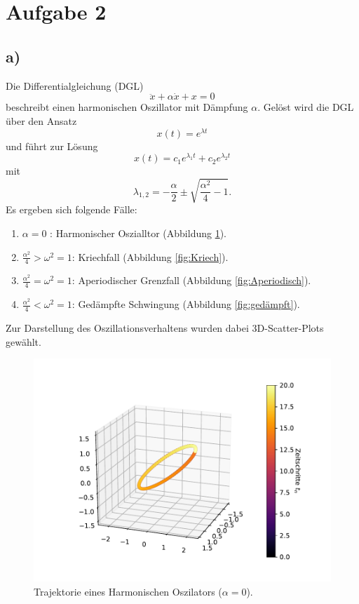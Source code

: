 \section*{Aufgabe 2}
\subsection*{a)}
Die Differentialgleichung (DGL) 
\begin{equation}
    \ddot{x} + \alpha \dot{x} + x = 0
\end{equation}
beschreibt einen harmonischen Oszillator mit Dämpfung $\alpha$.
Gelöst wird die DGL über den Ansatz 
\begin{equation}
    x(t) = e^{\lambda t}
\end{equation}
und führt zur Lösung 
\begin{equation}
    x(t) = c_1 e^{\lambda_1 t} + c_2 e^{\lambda_2 t}
\end{equation}
mit 
\begin{equation}
    \lambda_{1,2} = - \frac{\alpha}{2} \pm \sqrt{ \frac{\alpha^2}{4} -1 }.
\end{equation}
Es ergeben sich folgende Fälle:
\begin{enumerate}
    \item $\alpha = 0$ : Harmonischer Oszialltor (Abbildung \ref{fig:harmonisch}).
    \item $\frac{\alpha^2}{4} > \omega^2 = 1$: Kriechfall (Abbildung \ref{fig:Kriech}).
    \item $\frac{\alpha^2}{4} = \omega^2 = 1$: Aperiodischer Grenzfall (Abbildung \ref{fig:Aperiodisch}).
    \item $\frac{\alpha^2}{4} < \omega^2 = 1$: Gedämpfte Schwingung (Abbildung \ref{fig:gedämpft}).
\end{enumerate}
Zur Darstellung des Oszillationsverhaltens wurden dabei 3D-Scatter-Plots gewählt.
\begin{figure}
  \centering
  \includegraphics[scale=0.7]{A2/plots/aufg2_a1.pdf}
  \caption{Trajektorie eines Harmonischen Oszilators ($\alpha = 0$).}
  \label{fig:harmonisch}
\end{figure}

